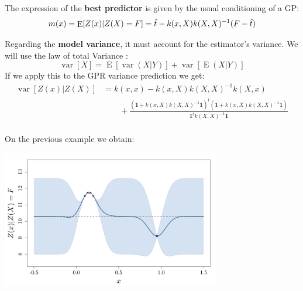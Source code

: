 \documentclass{beamer}
\DeclareMathOperator*{\Var}{var}
\DeclareMathOperator*{\E}{E}
\begin{document}
\begin{frame}{}
The expression of the \textbf{best predictor} is given by the usual conditioning of a GP:
\begin{equation*}
m(x) = \E[Z(x)|Z(X)=F] = \hat{t} - k(x,X) k(X,X)^{-1} (F - \hat{t}) \vspace{5mm}
\end{equation*} 

Regarding the \textbf{model variance}, it must account for the estimator's variance. We will use the law of total Variance :
\begin{equation*}
\Var[X] = \E[\Var(X|Y)] + \Var[\E(X|Y)]
\end{equation*} 
If we apply this to the GPR variance prediction we get:
\small
\begin{equation*}
\begin{split}
\Var[Z(x)|Z(X)] &=  k(x,x) - k(x,X) k(X,X)^{-1} k(X,x)   \\
& \qquad + \frac{(\mathbf{1} + k(x,X)k(X,X)^{-1}\mathbf{1})^t(\mathbf{1} + k(x,X)k(X,X)^{-1}\mathbf{1})}{\mathbf{1}^t k(X,X)^{-1} \mathbf{1}} \\
\end{split}
\end{equation*} 
\normalsize
\end{frame}

\begin{frame}{}
On the previous example we obtain:
\begin{center}
	\includegraphics[height=6cm]{figures/R/trend_ko}
\end{center}
\end{frame}
\end{document}
